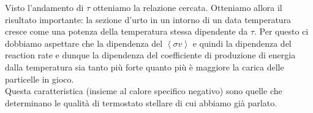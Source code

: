 Visto l'andamento di $\tau$ otteniamo la relazione cercata. Otteniamo allora il risultato importante: la sezione d'urto in un intorno di un data temperatura cresce come una potenza della temperatura stessa dipendente da $\tau$.
Per questo ci dobbiamo aspettare che la dipendenza del $\left<\sigma v\right>$  e quindi la dipendenza del reaction rate e dunque la dipendenza del coefficiente di produzione di energia dalla temperatura sia tanto più forte quanto più è maggiore la carica delle particelle in gioco.\\
Questa caratteristica (insieme al calore specifico negativo) sono quelle che determinano le qualità di termostato stellare di cui abbiamo già parlato.


